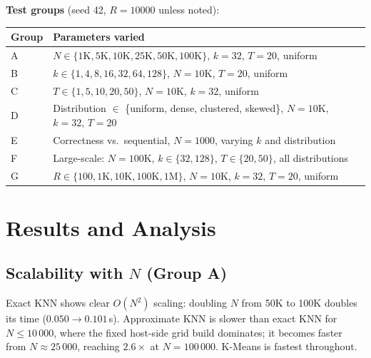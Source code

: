\documentclass[11pt,a4paper]{article}
\begin{document}
\textbf{Test groups} (seed 42, $R=10000$ unless noted):
\begin{center}
\begin{tabular}{ll}
\toprule
Group & Parameters varied \\
\midrule
A & $N \in \{1\text{K},5\text{K},10\text{K},25\text{K},50\text{K},100\text{K}\}$, $k=32$, $T=20$, uniform \\
B & $k \in \{1,4,8,16,32,64,128\}$, $N=10\text{K}$, $T=20$, uniform \\
C & $T \in \{1,5,10,20,50\}$, $N=10\text{K}$, $k=32$, uniform \\
D & Distribution $\in$ \{uniform, dense, clustered, skewed\}, $N=10\text{K}$, $k=32$, $T=20$ \\
E & Correctness vs.\ sequential, $N=1000$, varying $k$ and distribution \\
F & Large-scale: $N=100\text{K}$, $k\in\{32,128\}$, $T\in\{20,50\}$, all distributions \\
G & $R \in \{100,1\text{K},10\text{K},100\text{K},1\text{M}\}$, $N=10\text{K}$, $k=32$, $T=20$, uniform \\
\bottomrule
\end{tabular}
\end{center}

\section{Results and Analysis}
\label{sec:results}

\subsection{Scalability with \texorpdfstring{$N$}{N} (Group A)}

Exact KNN shows clear $O(N^2)$ scaling: doubling $N$ from 50K to 100K doubles
its time ($0.050 \to 0.101$\,s).  Approximate KNN is slower than exact KNN for
$N \le 10\,000$, where the fixed host-side grid build dominates; it becomes
faster from $N \approx 25\,000$, reaching $2.6\times$ at $N=100\,000$.
K-Means is fastest throughout.
\end{document}
